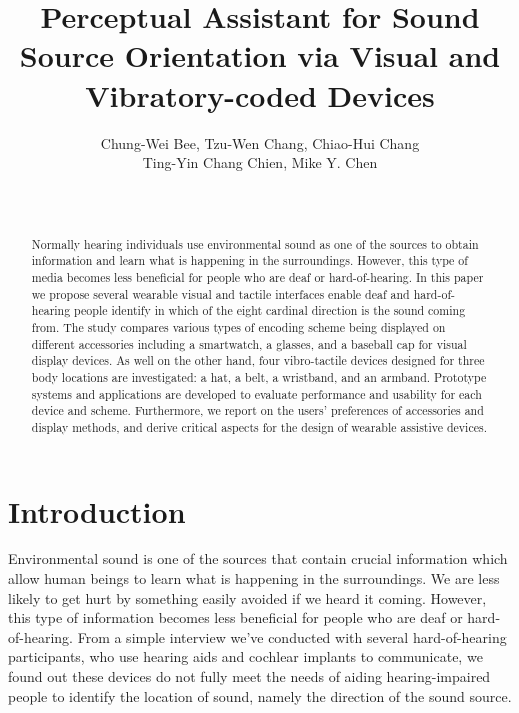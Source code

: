 \documentclass{sigchi}
\begin{document}
\title{Perceptual Assistant for Sound Source Orientation via Visual and Vibratory-coded Devices}

\author{ 
	\alignauthor Chung-Wei Bee, Tzu-Wen Chang, Chiao-Hui Chang
	\\ Ting-Yin Chang Chien, Mike Y. Chen\\
	\\
	\\
}


\maketitle

\begin{abstract}
Normally hearing individuals use environmental sound as one of the sources to obtain information and learn what is happening in the surroundings. However, this type of media becomes less beneficial for people who are deaf or hard-of-hearing. In this paper we propose several wearable visual and tactile interfaces enable deaf and hard-of-hearing people identify in which of the eight cardinal direction is the sound coming from. The study compares various types of encoding scheme being displayed on different accessories including a smartwatch, a glasses, and a baseball cap for visual display devices. As well on the other hand, four vibro-tactile devices designed for three body locations are investigated: a hat, a belt, a wristband, and an armband. Prototype systems and applications are developed to evaluate performance and usability for each device and scheme. Furthermore, we report on the users' preferences of accessories and display methods, and derive critical aspects for the design of wearable assistive devices.
\end{abstract}


\section{Introduction}
Environmental sound is one of the sources that contain crucial information which allow human beings to learn what is happening in the surroundings. We are less likely to get hurt by something easily avoided if we heard it coming. However, this type of information becomes less beneficial for people who are deaf or hard-of-hearing. From a simple interview we've conducted with several hard-of-hearing participants, who use hearing aids and cochlear implants to communicate, we found out these devices do not fully meet the needs of aiding hearing-impaired people to identify the location of sound, namely the direction of the sound source.
\end{document}
